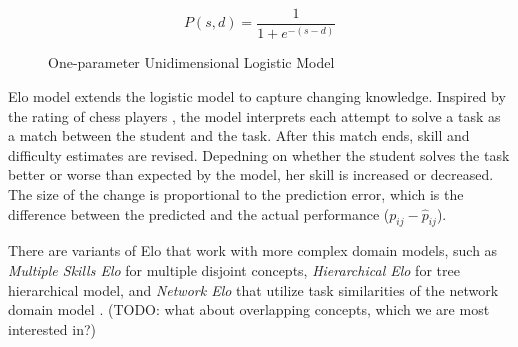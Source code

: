 \begin{figure}[htb]
\centering
\begin{subfigure}{.58\textwidth}
\centering
{}
\end{subfigure}
\begin{subfigure}{.38\textwidth}
\centering
\begin{equation}\label{eq:logistic}
P(s, d) = \frac{1}{1 + e^{-(s - d)}}
\end{equation}
\end{subfigure}
\caption{One-parameter Unidimensional Logistic Model}
\label{fig:logistic-model}
\end{figure}


Elo model \cite{alg.elo, mathsgarden} extends the logistic model
  to capture changing knowledge.
Inspired by the rating of chess players \cite{elo-rating},
  the model interprets each attempt  to solve a task
  as a match between the student and the task.
After this match ends, skill and difficulty estimates are revised.
Depedning on whether the student solves the task better or worse than expected
  by the model, her skill is increased or decreased.
The size of the change is proportional to the prediction error, which is the difference
  between the predicted and the actual performance ($p_{ij} - \hat{p}_{ij}$). %

There are variants of Elo that work with more complex domain models,
such as \emph{Multiple Skills Elo} for multiple disjoint concepts,
\emph{Hierarchical Elo} for tree hierarchical model,
and \emph{Network Elo} that utilize task similarities of the network domain model
\cite{rihak-phd}.
(TODO: what about overlapping concepts, which we are most interested in?)


